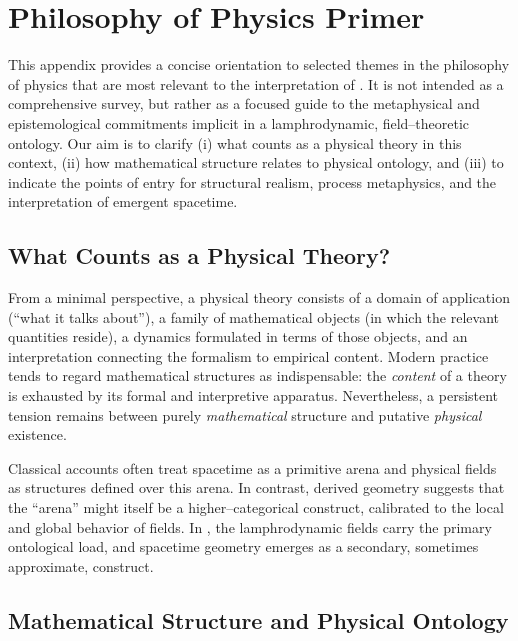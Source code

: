 
\chapter{Philosophy of Physics Primer}
\label{app:philosophy}

This appendix provides a concise orientation to selected themes in the
philosophy of physics that are most relevant to the interpretation of
\rsvpabbr{}.  It is not intended as a comprehensive survey, but rather as
a focused guide to the metaphysical and epistemological commitments
implicit in a lamphrodynamic, field--theoretic ontology.  Our aim is to
clarify (i) what counts as a physical theory in this context, (ii)
how mathematical structure relates to physical ontology, and (iii) to
indicate the points of entry for structural realism, process
metaphysics, and the interpretation of emergent spacetime.

\section{What Counts as a Physical Theory?}

From a minimal perspective, a physical theory consists of a domain of
application (``what it talks about''), a family of mathematical objects
(in which the relevant quantities reside), a dynamics formulated in
terms of those objects, and an interpretation connecting the formalism
to empirical content.  Modern practice tends to regard mathematical
structures as indispensable: the \emph{content} of a theory is exhausted
by its formal and interpretive apparatus.  Nevertheless, a persistent
tension remains between purely \emph{mathematical} structure and
putative \emph{physical} existence.

Classical accounts often treat spacetime as a primitive arena and
physical fields as structures defined over this arena.  In contrast,
derived geometry suggests that the ``arena'' might itself be a
higher--categorical construct, calibrated to the local and global
behavior of fields.  In \rsvpabbr{}, the lamphrodynamic fields carry the
primary ontological load, and spacetime geometry emerges as a secondary,
sometimes approximate, construct.

\section{Mathematical Structure and Physical Ontology}

